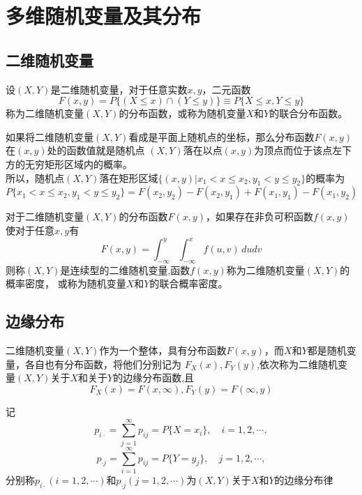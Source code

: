 \section{多维随机变量及其分布}

\subsection{二维随机变量}
\begin{definition}[联合分布函数]
    设$(X,Y)$是二维随机变量，对于任意实数$x,y$，二元函数
    $$F(x,y)=P\{(X\leq x)\cap(Y\leq y)\} \equiv P\{X\leq x,Y\leq y\}$$
    称为二维随机变量$(X,Y)$的{\heiti 分布函数}，或称为随机变量$X$和$Y$的{\heiti 联合分布函数}。

    如果将二维随机变量$(X,Y)$看成是平面上随机点的坐标，那么分布函数$F(x,y)$在$(x,y)$处的函数值就是随机点
    $(X,Y)$落在以点$(x,y)$为顶点而位于该点左下方的无穷矩形区域内的概率。
    \\所以，随机点$(X,Y)$落在矩形区域$\{(x,y)|x_1<x\leq x_2,y_1<y\leq y_2\}$的概率为
    $$P\{x_1<x\leq x_2,y_1<y\leq y_2\}=F(x_2,y_2)-F(x_2,y_1)+F(x_1,y_1)-F(x_1,y_2)$$
\end{definition}

\begin{definition}[联合概率密度]
    对于二维随机变量$(X,Y)$的分布函数$F(x,y)$，如果存在非负可积函数$f(x,y)$使对于任意$x,y$有
    $$F(x,y)=\int_{-\infty}^{y}\int_{-\infty}^x f(u,v)\,dudv$$
    则称$(X,Y)$是{\heiti 连续型的二维随机变量},函数$f(x,y)$称为二维随机变量$(X,Y)$的{\heiti 概率密度}，
    或称为随机变量$X$和$Y$的{\heiti 联合概率密度}。
\end{definition}

\subsection{边缘分布}
\begin{definition}[边缘分布函数]
    二维随机变量$(X,Y)$作为一个整体，具有分布函数$F(x,y)$，而$X$和$Y$都是随机变量，各自也有分布函数，将他们分别记为
    $F_X(x),F_Y(y)$,依次称为二维随机变量$(X,Y)$关于$X$和关于$Y$的{\heiti 边缘分布函数},且
    $$F_X(x)=F(x,\infty),F_Y(y)=F(\infty,y)$$
\end{definition}

\begin{definition}[边缘分布律]
    记
    $$p_{i\cdot}=\sum\limits_{j=1}^\infty p_{ij}=P\{X=x_i\},\quad i=1,2,\cdots,$$
    $$p_{\cdot j}=\sum\limits_{i=1}^\infty p_{ij}=P\{Y=y_j\},\quad j=1,2,\cdots,$$
    分别称$p_{i\cdot}(i=1,2,\cdots)$和$p_{\cdot j}(j=1,2,\cdots)$为$(X,Y)$关于$X$和$Y$的{\heiti 边缘分布律}
\end{definition}

